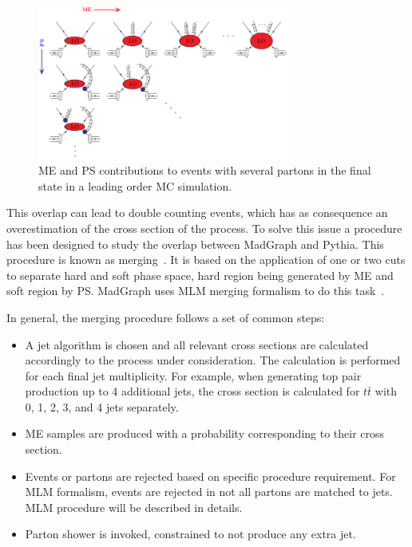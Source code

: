 \begin{figure}[!Hhtbp]
  \begin{center}
    \includegraphics[width=0.75\textwidth]{figs/PSMEInterface.png}
    \caption{ME and PS contributions to events with several partons in the final state in a leading order MC simulation.}
    \label{fig:PSME}
  \end{center}
\end{figure}

This overlap can lead to double counting events, which has as consequence an overestimation of the cross section of the process. To solve this issue a procedure has been designed to study the overlap between MadGraph and Pythia. This procedure is known as merging~\cite{Alwall:2007fs, Alwall:2008qv, Lavesson:2007uu}. It is based on the application of one or two cuts to separate hard and soft phase space, hard region being generated by ME and soft region by PS. MadGraph uses MLM merging formalism to do this task~\cite{Mangano:2001xp, Mangano:2006rw}. 

In general, the merging procedure follows a set of common steps:
\begin{itemize}
\item A jet algorithm is chosen and all relevant cross sections are calculated accordingly to the process under consideration. The calculation is performed for each final jet multiplicity. For example, when generating top pair production up to 4 additional jets, the cross section is calculated for $t\bar{t}$ with 0, 1, 2, 3, and 4 jets separately. 
\item ME samples are produced with a probability corresponding to their cross section.
\item Events or partons are rejected based on specific procedure requirement. For MLM formalism, events are rejected in not all partons are matched to jets. MLM procedure will be described in details. 
\item Parton shower is invoked, constrained to not produce any extra jet.
\end{itemize}

